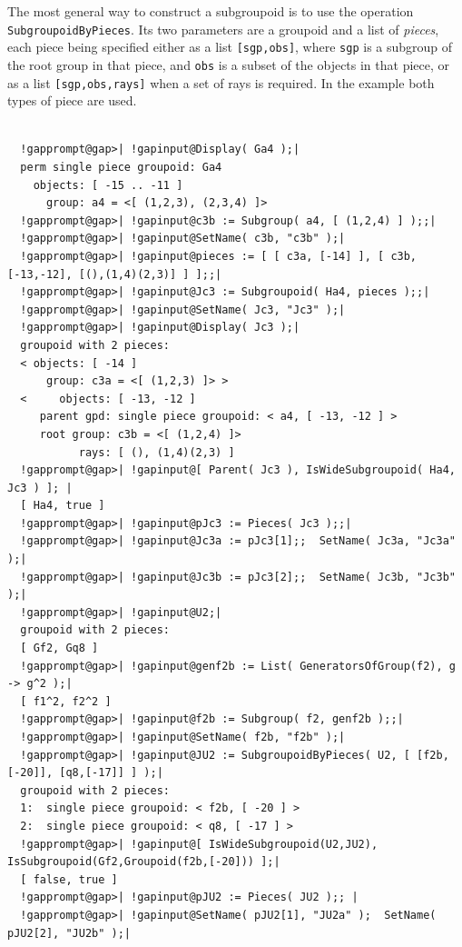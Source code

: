 \documentclass[a4paper,11pt]{report}
\begin{document}
{{{ The most general way to construct a subgroupoid is to use the operation \texttt{SubgroupoidByPieces}. Its two parameters are a groupoid and a list of \emph{pieces}, each piece being specified either as a list \texttt{[sgp,obs]}, where \texttt{sgp} is a subgroup of the root group in that piece, and \texttt{obs} is a subset of the objects in that piece, or as a list \texttt{[sgp,obs,rays]} when a set of rays is required. In the example both types of piece are used. 

 }

 
\begin{Verbatim}[commandchars=!@|,fontsize=\small,frame=single,label=Example]
  
  !gapprompt@gap>| !gapinput@Display( Ga4 );|
  perm single piece groupoid: Ga4
    objects: [ -15 .. -11 ]
      group: a4 = <[ (1,2,3), (2,3,4) ]>
  !gapprompt@gap>| !gapinput@c3b := Subgroup( a4, [ (1,2,4) ] );;|
  !gapprompt@gap>| !gapinput@SetName( c3b, "c3b" );|
  !gapprompt@gap>| !gapinput@pieces := [ [ c3a, [-14] ], [ c3b, [-13,-12], [(),(1,4)(2,3)] ] ];;|
  !gapprompt@gap>| !gapinput@Jc3 := Subgroupoid( Ha4, pieces );;|
  !gapprompt@gap>| !gapinput@SetName( Jc3, "Jc3" );|
  !gapprompt@gap>| !gapinput@Display( Jc3 );|
  groupoid with 2 pieces:
  < objects: [ -14 ]
      group: c3a = <[ (1,2,3) ]> >
  <     objects: [ -13, -12 ]
     parent gpd: single piece groupoid: < a4, [ -13, -12 ] >
     root group: c3b = <[ (1,2,4) ]>
           rays: [ (), (1,4)(2,3) ]
  !gapprompt@gap>| !gapinput@[ Parent( Jc3 ), IsWideSubgroupoid( Ha4, Jc3 ) ]; |
  [ Ha4, true ]
  !gapprompt@gap>| !gapinput@pJc3 := Pieces( Jc3 );;|
  !gapprompt@gap>| !gapinput@Jc3a := pJc3[1];;  SetName( Jc3a, "Jc3a" );|
  !gapprompt@gap>| !gapinput@Jc3b := pJc3[2];;  SetName( Jc3b, "Jc3b" );|
  !gapprompt@gap>| !gapinput@U2;|
  groupoid with 2 pieces:
  [ Gf2, Gq8 ]
  !gapprompt@gap>| !gapinput@genf2b := List( GeneratorsOfGroup(f2), g -> g^2 );|
  [ f1^2, f2^2 ]
  !gapprompt@gap>| !gapinput@f2b := Subgroup( f2, genf2b );;|
  !gapprompt@gap>| !gapinput@SetName( f2b, "f2b" );|
  !gapprompt@gap>| !gapinput@JU2 := SubgroupoidByPieces( U2, [ [f2b,[-20]], [q8,[-17]] ] );|
  groupoid with 2 pieces:
  1:  single piece groupoid: < f2b, [ -20 ] >
  2:  single piece groupoid: < q8, [ -17 ] >
  !gapprompt@gap>| !gapinput@[ IsWideSubgroupoid(U2,JU2), IsSubgroupoid(Gf2,Groupoid(f2b,[-20])) ];|
  [ false, true ]
  !gapprompt@gap>| !gapinput@pJU2 := Pieces( JU2 );; |
  !gapprompt@gap>| !gapinput@SetName( pJU2[1], "JU2a" );  SetName( pJU2[2], "JU2b" );|
  
\end{Verbatim}
 

}}
\end{document}

